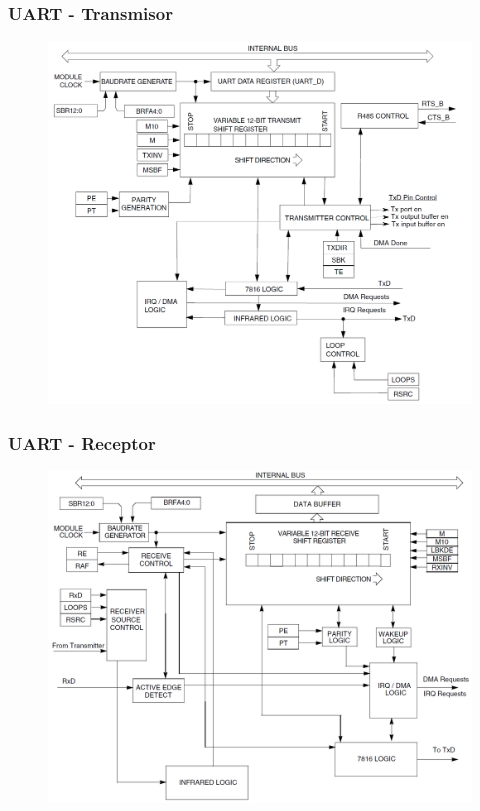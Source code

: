\documentclass[10.5pt,scale=1.0,t,aspectratio=169,hyperref={pdfpagelabels=false}]{beamer}
\begin{document}
\begin{frame}
	\frametitle{UART - Transmisor}
	
	\begin{figure}
		\centering
		\includegraphics[scale=0.35]{36_UARTTransmitter}
	\end{figure}
\end{frame}
\begin{frame}
	\frametitle{UART - Receptor}
	
	\begin{figure}
		\centering
		\includegraphics[scale=0.35]{37_UARTReceiver}
	\end{figure}
\end{frame}
\end{document}
